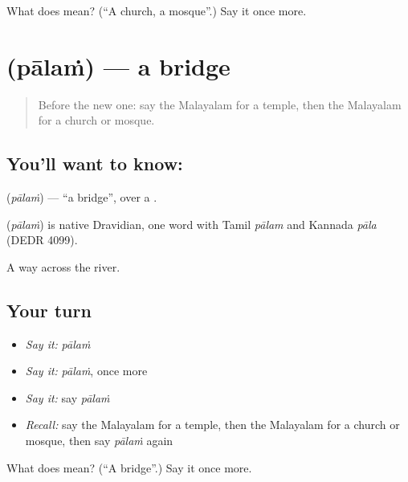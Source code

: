 \begin{tcolorbox}[breakable,colback=teal!4,colframe=teal!35!black,title={Before you move on}]
What does  mean? (\textquotedblleft{}A church, a mosque\textquotedblright{}.) Say it once more.
\end{tcolorbox}
\section[\texorpdfstring{\ml{പാലം} (pālaṁ)}{പാലം (pālaṁ)}]{ (pālaṁ) — a bridge}

\label{lesson:ML-C135-bridge}



\begin{quote}
Before the new one: say the Malayalam for a temple, then the Malayalam for a church or mosque.
\end{quote}

\subsection*{You'll want to know: }
\textbf{} (\emph{pālaṁ}) — \textquotedblleft{}a bridge\textquotedblright{}, over a \textbf{}.

\begin{cousinweb}
\textbf{} (\emph{pālaṁ}) is native Dravidian, one word with Tamil \emph{pālam} and Kannada \emph{pāla} (DEDR 4099).
\end{cousinweb}

\begin{grammarlens}[title={What you've built}]
A way across the river.
\end{grammarlens}

\subsection*{Your turn}
\begin{itemize}
\raggedright
  \item \emph{Say it:} \emph{pālaṁ}
  \item \emph{Say it:} \emph{pālaṁ}, once more
  \item \emph{Say it:} say \emph{pālaṁ}
  \item \emph{Recall:} say the Malayalam for a temple, then the Malayalam for a church or mosque, then say \emph{pālaṁ} again
\end{itemize}

\begin{tcolorbox}[breakable,colback=teal!4,colframe=teal!35!black,title={Before you move on}]
What does  mean? (\textquotedblleft{}A bridge\textquotedblright{}.) Say it once more.
\end{tcolorbox}
